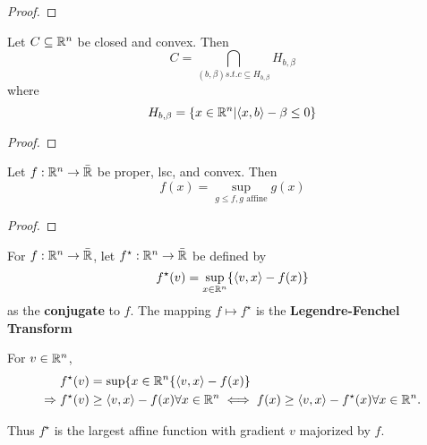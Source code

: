 \begin{proof}
\end{proof}

\begin{thm}
  \label{defn:conjugate_functions:3}
  Let $C \subseteq \mathbb{R}^{n}$ be closed and convex.  Then
  \begin{equation}
    \label{eq:50}
    C = \bigcap_{(b, \beta) s.t. c \subseteq H_{b, \beta}} H_{b, \beta}
  \end{equation} where
  \begin{equation}
    \label{eq:51}
    H_{b, \beta} = \{ x \in \mathbb{R}^{n} | \langle x, b \rangle - \beta
    \leq 0 \}
  \end{equation}
\end{thm}

\begin{proof}
  \todo{}
\end{proof}

\begin{thm}
  \label{defn:conjugate_functions:4}
  Let $f: \mathbb{R}^{n} \rightarrow \bar {\mathbb{R}}$ be proper, lsc, and convex.
  Then
  \begin{equation}
    \label{eq:52}
    f(x) = \sup_{g \leq f, \text{$g$ affine}} g(x)
  \end{equation}
\end{thm}

\begin{proof}
\end{proof}

\begin{defn}
  \label{defn:conjugate_functions:5}
  For $f: \mathbb{R}^{n} \rightarrow \bar {\mathbb{R}}$, let $f^{\star}: \mathbb{R}^{n}
  \rightarrow \bar {\mathbb{R}}$ be defined by
  \begin{equation}
    \label{eq:53}
    f^{\star}(v) = \sup_{x \in \mathbb{R}^{n}} \{ \langle v, x \rangle - f(x) \}
  \end{equation}
  as the \textbf{conjugate} to $f$. The mapping $f \mapsto f^{\star}$
  is the \textbf{Legendre-Fenchel Transform}
\end{defn}

\begin{remark}
  For $v \in \mathbb{R}^{n}$, 
  \begin{align}
    \label{eq:126}
    f^{\star}(v) &= \sup \{ x \in \mathbb{R}^{n} \{ \langle v, x \rangle - f(x)
    \} \\
    \Rightarrow f^{\star}(v) &\geq \langle v, x \rangle - f(x)
    \forall x \in \mathbb{R}^{n} \iff f(x) \geq \langle v, x \rangle -
    f^{\star}(x) \forall x \in \mathbb{R}^n.
  \end{align}

  Thus $f^{\star}$ is the largest affine function with gradient $v$
  majorized by $f$.
\end{remark}

